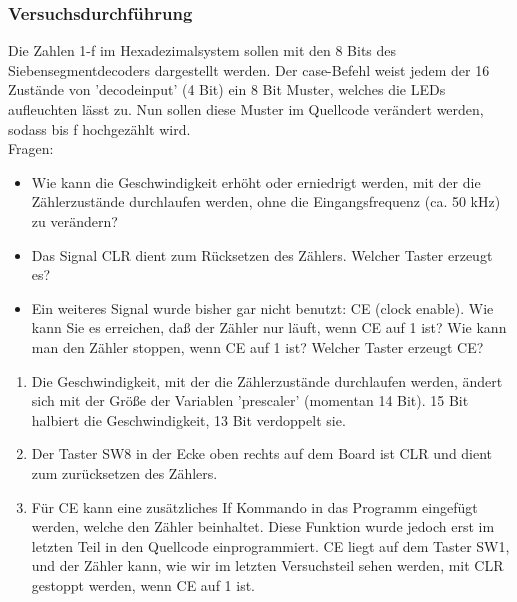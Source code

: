 \documentclass[12pt,a4paper]{article}
\begin{document}
\subsubsection*{Versuchsdurchführung}
Die Zahlen 1-f im Hexadezimalsystem sollen mit den 8 Bits des Siebensegmentdecoders dargestellt werden. Der case-Befehl weist jedem der 16 Zustände von 'decodeinput' (4 Bit) ein 8 Bit Muster, welches die LEDs aufleuchten lässt zu. Nun sollen diese Muster im Quellcode verändert werden, sodass bis f hochgezählt wird. \\
Fragen:
\begin{itemize}
\item Wie kann die Geschwindigkeit erhöht oder erniedrigt werden, mit der die Zählerzustände durchlaufen werden, ohne die Eingangsfrequenz (ca. 50 kHz) zu verändern?
\item Das Signal CLR dient zum Rücksetzen des Zählers. Welcher Taster erzeugt es?
\item Ein weiteres Signal wurde bisher gar nicht benutzt: CE (clock enable). Wie kann Sie es erreichen, daß der Zähler nur läuft, wenn CE auf 1 ist? Wie kann man den Zähler stoppen, wenn CE auf 1 ist? Welcher Taster erzeugt CE?
\end{itemize} 
\begin{enumerate}
\item Die Geschwindigkeit, mit der die Zählerzustände durchlaufen werden, ändert sich mit der Größe der Variablen 'prescaler' (momentan 14 Bit). 15 Bit halbiert die Geschwindigkeit, 13 Bit verdoppelt sie.
\item Der Taster SW8 in der Ecke oben rechts auf dem Board ist CLR und dient zum zurücksetzen des Zählers.
\item Für CE kann eine zusätzliches If Kommando in das Programm eingefügt werden, welche den Zähler beinhaltet. Diese Funktion wurde jedoch erst im letzten Teil in den Quellcode einprogrammiert. CE liegt auf dem Taster SW1, und der Zähler kann, wie wir im letzten Versuchsteil sehen werden, mit CLR gestoppt werden, wenn CE auf 1 ist.
\end{enumerate}
\end{document}
